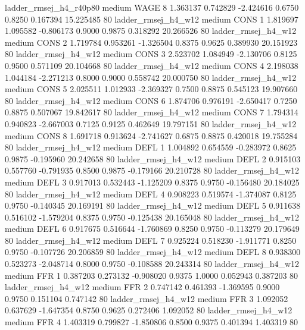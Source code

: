 ladder_rmsej_h4_r40p80     medium     WAGE                 8  1.363137 0.742829 -2.424616 0.6750 0.8250  0.167394   15.225485 80
   ladder_rmsej_h4_w12     medium     CONS                 1  1.819697 1.095582 -0.806173 0.9000 0.9875  0.318292   20.266526 80
   ladder_rmsej_h4_w12     medium     CONS                 2  1.719784 0.953261 -1.326504 0.8375 0.9625  0.389930   20.151923 80
   ladder_rmsej_h4_w12     medium     CONS                 3  2.523702 1.084949 -2.130706 0.8125 0.9500  0.571109   20.104668 80
   ladder_rmsej_h4_w12     medium     CONS                 4  2.198038 1.044184 -2.271213 0.8000 0.9000  0.558742   20.000750 80
   ladder_rmsej_h4_w12     medium     CONS                 5  2.025511 1.012933 -2.369327 0.7500 0.8875  0.545123   19.907660 80
   ladder_rmsej_h4_w12     medium     CONS                 6  1.874706 0.976191 -2.650417 0.7250 0.8875  0.507067   19.842617 80
   ladder_rmsej_h4_w12     medium     CONS                 7  1.794314 0.940823 -2.667003 0.7125 0.9125  0.462649   19.797151 80
   ladder_rmsej_h4_w12     medium     CONS                 8  1.691718 0.913624 -2.741627 0.6875 0.8875  0.420018   19.755284 80
   ladder_rmsej_h4_w12     medium     DEFL                 1  1.004892 0.654559 -0.283972 0.8625 0.9875 -0.195960   20.242658 80
   ladder_rmsej_h4_w12     medium     DEFL                 2  0.915103 0.557760 -0.791935 0.8500 0.9875 -0.179166   20.210728 80
   ladder_rmsej_h4_w12     medium     DEFL                 3  0.917013 0.532443 -1.125209 0.8375 0.9750 -0.156480   20.184025 80
   ladder_rmsej_h4_w12     medium     DEFL                 4  0.908223 0.519574 -1.374087 0.8125 0.9750 -0.140345   20.169191 80
   ladder_rmsej_h4_w12     medium     DEFL                 5  0.911638 0.516102 -1.579204 0.8375 0.9750 -0.125438   20.165048 80
   ladder_rmsej_h4_w12     medium     DEFL                 6  0.917675 0.516644 -1.760869 0.8250 0.9750 -0.113279   20.179649 80
   ladder_rmsej_h4_w12     medium     DEFL                 7  0.925224 0.518230 -1.911771 0.8250 0.9750 -0.107726   20.206859 80
   ladder_rmsej_h4_w12     medium     DEFL                 8  0.938300 0.523273 -2.048714 0.8000 0.9750 -0.108588   20.243314 80
   ladder_rmsej_h4_w12     medium      FFR                 1  0.387203 0.273132 -0.908020 0.9375 1.0000  0.052943    0.387203 80
   ladder_rmsej_h4_w12     medium      FFR                 2  0.747142 0.461393 -1.369595 0.9000 0.9750  0.151104    0.747142 80
   ladder_rmsej_h4_w12     medium      FFR                 3  1.092052 0.637629 -1.647354 0.8750 0.9625  0.272406    1.092052 80
   ladder_rmsej_h4_w12     medium      FFR                 4  1.403319 0.799827 -1.850806 0.8500 0.9375  0.401394    1.403319 80

